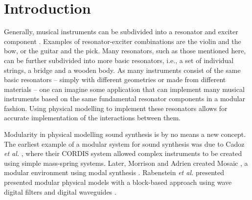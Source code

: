 \documentclass{article}
\title{\papertitle}
\begin{document}
%
\capstartfalse
\maketitle
\capstarttrue
%
\begin{abstract}
Through recent advances in processing power, physical modelling using finite-difference time-domain (FDTD) methods has gained an increased popularity. Though many different musical instrument models based on these methods exist, nearly all are based on the same underlying systems and interactions between them. This paper presents an application where individual resonator modules, such as strings, bars, membranes and plates, can be connected and interacted with in real time.  Various excitations, including the bow, hammer and pluck, are implemented as well, allowing for expressive control and a wide sonic palette. Existing and non-existing model configurations can easily be implemented, modified and experimented with, as well as the parameters describing them.
\end{abstract}
%

\section{Introduction}\label{sec:introduction}
Generally, musical instruments can be subdivided into a resonator and exciter component \cite{Borin1989}. Examples of resonator-exciter combinations are the violin and the bow, or the guitar and the pick. Many resonators, such as those mentioned here, can be further subdivided into more basic resonators, i.e., a set of individual strings, a bridge and a wooden body. As many instruments consist of the same basic resonators -- simply with different geometries or made from different materials -- one can imagine some application that can implement many musical instruments based on the same fundamental resonator components in a modular fashion. Using physical modelling to implement these resonators allows for accurate implementation of the interactions between them.  

Modularity in physical modelling sound synthesis is by no means a new concept. The earliest example of a modular system for sound synthesis was due to Cadoz \textit{et al.} \cite{Cadoz1983}, where their CORDIS system allowed complex instruments to be created using simple mass-spring systems. Later, Morrison and Adrien created Mosaic \cite{Morrison1993}, a modular environment using modal synthesis \cite{Adrien1991}. Rabenstein \textit{et al.} presented presented modular physical models with a block-based approach using wave digital filters \cite{Rabenstein2007} and digital waveguides \cite{Smith1992}. 
\end{document}
